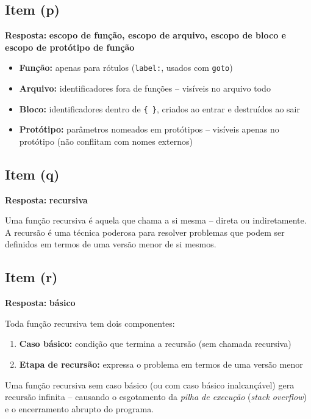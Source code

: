 \documentclass[12pt,a4paper]{article}
\begin{document}
\subsection*{Item (p)}
\begin{respostabox}
\textbf{Resposta:} \textcolor{deitelblue}{\textbf{escopo de função, escopo de arquivo, escopo de bloco e escopo de protótipo de função}}

\begin{itemize}[noitemsep]
  \item \textbf{Função:} apenas para rótulos (\texttt{label:}, usados com \texttt{goto})
  \item \textbf{Arquivo:} identificadores fora de funções -- visíveis no arquivo todo
  \item \textbf{Bloco:} identificadores dentro de \texttt{\{ \}}, criados ao entrar e
  destruídos ao sair
  \item \textbf{Protótipo:} parâmetros nomeados em protótipos -- visíveis apenas no
  protótipo (não conflitam com nomes externos)
\end{itemize}
\end{respostabox}

\subsection*{Item (q)}
\begin{respostabox}
\textbf{Resposta:} \textcolor{deitelblue}{\textbf{recursiva}}

Uma função recursiva é aquela que chama a si mesma -- direta ou indiretamente.
A recursão é uma técnica poderosa para resolver problemas que podem ser definidos
em termos de uma versão menor de si mesmos.
\end{respostabox}

\subsection*{Item (r)}
\begin{respostabox}
\textbf{Resposta:} \textcolor{deitelblue}{\textbf{básico}}

Toda função recursiva tem dois componentes:
\begin{enumerate}[noitemsep]
  \item \textbf{Caso básico:} condição que termina a recursão (sem chamada recursiva)
  \item \textbf{Etapa de recursão:} expressa o problema em termos de uma versão menor
\end{enumerate}

\begin{erroco}
  Uma função recursiva sem caso básico (ou com caso básico inalcançável) gera
  recursão infinita -- causando o esgotamento da \textit{pilha de execução}
  (\textit{stack overflow}) e o encerramento abrupto do programa.
\end{erroco}
\end{respostabox}
\end{document}
